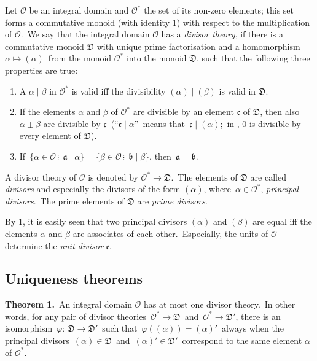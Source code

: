 \documentclass[12pt]{article}
\theoremstyle{definition}
\begin{document}
Let $\mathcal{O}$ be an integral domain and $\mathcal{O}^*$ the set of its non-zero elements; this set forms a commutative monoid (with identity 1) with respect to the multiplication of $\mathcal{O}$.\, We say that the integral domain $\mathcal{O}$ has a {\em divisor theory}, if there is a commutative monoid $\mathfrak{D}$ with unique prime factorisation and a homomorphism \, $\alpha \mapsto (\alpha)$\, from the monoid $\mathcal{O}^*$ into the monoid $\mathfrak{D}$, such that the following three properties are true:
\begin{enumerate}
\item A  $\alpha \mid \beta$ in $\mathcal{O}^*$ is valid iff the divisibility $(\alpha) \mid (\beta)$ is valid in $\mathfrak{D}$.
\item If the elements $\alpha$ and $\beta$ of $\mathcal{O}^*$ are divisible by an element $\mathfrak{c}$ of $\mathfrak{D}$, then also $\alpha\pm\beta$ are divisible by $\mathfrak{c}$\, (``$\mathfrak{c} \mid \alpha$''\, means that\, $\mathfrak{c} \mid (\alpha)$;\, in , 0 is divisible by every element of $\mathfrak{D}$).
\item If\, $\{\alpha\in\mathcal{O}\,\vdots\;\, \mathfrak{a} \mid \alpha\} = \{\beta\in\mathcal{O}\,\vdots\;\, \mathfrak{b} \mid \beta\}$,\; then\, $\mathfrak{a = b}$.\\
\end{enumerate}
A divisor theory of $\mathcal{O}$ is denoted by\; $\mathcal{O}^* \to \mathfrak{D}$.\, The elements of $\mathfrak{D}$ are called {\em divisors} and especially the divisors of the form $(\alpha)$, where\, $\alpha\in\mathcal{O}^*$, {\em principal divisors}.\, The prime elements of $\mathfrak{D}$ are {\em prime divisors}.

By 1, it is easily seen that two principal divisors $(\alpha)$ and $(\beta)$ are equal iff the elements $\alpha$ and $\beta$ are associates of each other.\, Especially, the units of $\mathcal{O}$ determine the {\em unit divisor} $\mathfrak{e}$.


\subsection{Uniqueness theorems}

\textbf{Theorem 1.}\, An integral domain $\mathcal{O}$ has at most one divisor theory.\, In other words, for any pair of divisor theories\, $\mathcal{O}^* \to \mathfrak{D}$\, and\, $\mathcal{O}^* \to \mathfrak{D}'$, there is an isomorphism \,$\varphi\!:\, \mathfrak{D} \to \mathfrak{D}'$\, such that\, $\varphi((\alpha)) = (\alpha)'$\, always when the principal divisors\, $(\alpha)\in\mathfrak{D}$\, and\, $(\alpha)'\in\mathfrak{D}'$\,  correspond to the same element $\alpha$ of $\mathcal{O}^*$.\\
\end{document}
